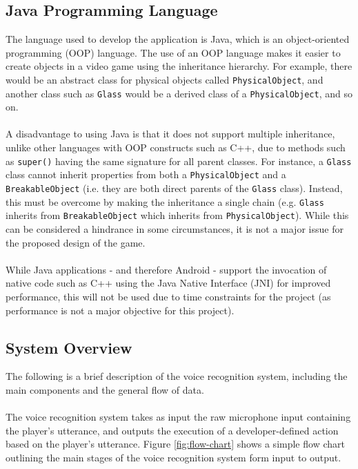 \documentclass[11pt]{article}
\begin{document}
\subsection{Java Programming Language}

The language used to develop the application is Java, which is an object-oriented programming (OOP) language. The use of an OOP language makes it easier to create objects in a video game using the inheritance hierarchy. For example, there would be an abstract class for physical objects called \texttt{PhysicalObject}, and another class such as \texttt{Glass} would be a derived class of a \texttt{PhysicalObject}, and so on.
\\
\\
A disadvantage to using Java is that it does not support multiple inheritance, unlike other languages with OOP constructs such as C++, due to methods such as \texttt{super()} having the same signature for all parent classes. For instance, a \texttt{Glass} class cannot inherit properties from both a \texttt{PhysicalObject} and a \texttt{BreakableObject} (i.e. they are both direct parents of the \texttt{Glass} class). Instead, this must be overcome by making the inheritance a single chain (e.g. \texttt{Glass} inherits from \texttt{BreakableObject} which inherits from \texttt{PhysicalObject}). While this can be considered a hindrance in some circumstances, it is not a major issue for the proposed design of the game.
\\
\\
While Java applications - and therefore Android - support the invocation of native code such as C++ using the Java Native Interface (JNI) for improved performance, this will not be used due to time constraints for the project (as performance is not a major objective for this project).

\subsection{System Overview}

The following is a brief description of the voice recognition system, including the main components and the general flow of data.
\\
\\
The voice recognition system takes as input the raw microphone input containing the player's utterance, and outputs the execution of a developer-defined action based on the player's utterance. Figure \ref{fig:flow-chart} shows a simple flow chart outlining the main stages of the voice recognition system form input to output.
\end{document}
